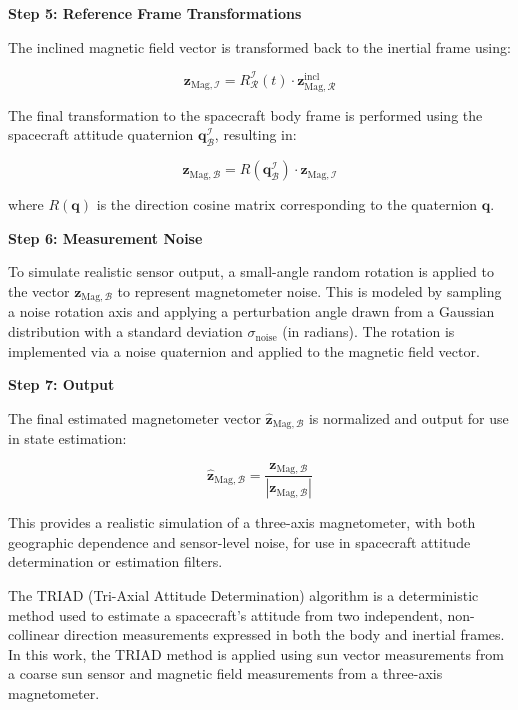 \textbf{Step 5: Reference Frame Transformations}

The inclined magnetic field vector is transformed back to the inertial frame using:

\begin{equation}
    \mathbf{z}_{\text{Mag},\mathcal{I}} = R_{\mathcal{R}}^{\mathcal{I}}(t) \cdot \mathbf{z}_{\text{Mag},\mathcal{R}}^{\text{incl}}
\end{equation}

The final transformation to the spacecraft body frame is performed using the spacecraft attitude quaternion $\mathbf{q}_{\mathcal{B}}^{\mathcal{I}}$, resulting in:

\begin{equation}
    \mathbf{z}_{\text{Mag},\mathcal{B}} = R(\mathbf{q}_{\mathcal{B}}^{\mathcal{I}}) \cdot \mathbf{z}_{\text{Mag},\mathcal{I}}
\end{equation}

where $R(\mathbf{q})$ is the direction cosine matrix corresponding to the quaternion $\mathbf{q}$.

\textbf{Step 6: Measurement Noise}

To simulate realistic sensor output, a small-angle random rotation is applied to the vector $\mathbf{z}_{\text{Mag},\mathcal{B}}$ to represent magnetometer noise. This is modeled by sampling a noise rotation axis and applying a perturbation angle drawn from a Gaussian distribution with a standard deviation $\sigma_{\text{noise}}$ (in radians). The rotation is implemented via a noise quaternion and applied to the magnetic field vector.

\textbf{Step 7: Output}

The final estimated magnetometer vector $\hat{\mathbf{z}}_{\text{Mag},\mathcal{B}}$ is normalized and output for use in state estimation:

\begin{equation}
    \hat{\mathbf{z}}_{\text{Mag},\mathcal{B}} = \frac{\mathbf{z}_{\text{Mag},\mathcal{B}}}{|\mathbf{z}_{\text{Mag},\mathcal{B}}|}
\end{equation}

This provides a realistic simulation of a three-axis magnetometer, with both geographic dependence and sensor-level noise, for use in spacecraft attitude determination or estimation filters.



The TRIAD (Tri-Axial Attitude Determination) algorithm is a deterministic method used to estimate a spacecraft's attitude from two independent, non-collinear direction measurements expressed in both the body and inertial frames. In this work, the TRIAD method is applied using sun vector measurements from a coarse sun sensor and magnetic field measurements from a three-axis magnetometer.

